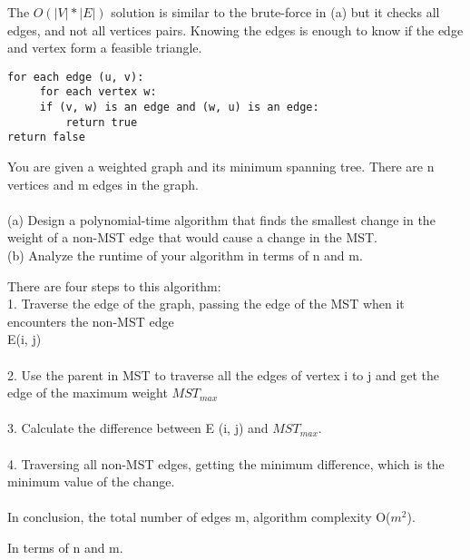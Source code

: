 \documentclass[10pt]{article}
\newenvironment{exercise}[2][Exercise]{\begin{trivlist}
\item[\hskip \labelsep {\bfseries #1}\hskip \labelsep {\bfseries #2.}]}{\end{trivlist}}
\newenvironment{solution}[2][Solution]{\begin{trivlist}
\item[\hskip \labelsep {\bfseries #1}\hskip \labelsep {\bfseries #2.}]}{\end{trivlist}}
\theoremstyle{definition}
\begin{document}
\begin{solution}{(4b)}
The $O(|V |*|E|)$ solution is similar to the brute-force in (a) but it checks all edges, and not all vertices pairs. Knowing the edges is enough to know if the edge and vertex form a feasible triangle.\\
\begin{verbatim}
for each edge (u, v):
     for each vertex w:
     if (v, w) is an edge and (w, u) is an edge:
         return true
return false
\end{verbatim}
\end{solution}

\begin{exercise}{(5)}
You are given a weighted graph and its minimum spanning tree. There are n vertices and m
edges in the graph.\\
\\
(a) Design a polynomial-time algorithm that finds the smallest change in the weight of a
non-MST edge that would cause a change in the MST.\\
(b) Analyze the runtime of your algorithm in terms of n and m.\\
\end{exercise}

\begin{solution}{(5a)}
There are four steps to this algorithm:\\
1. Traverse the edge of the graph, passing the edge of the MST when it encounters the non-MST edge\\
E(i, j)\\
\\
2. Use the parent in MST to traverse all the edges of vertex i to j and get the edge of the maximum weight $MST_{max}$\\
\\
3. Calculate the difference between E (i, j) and $MST_{max}$.\\
\\
4. Traversing all non-MST edges, getting the minimum difference, which is the minimum value of the change.\\
\\
In conclusion, the total number of edges m, algorithm complexity O($m^2$).
\end{solution}

\begin{solution}{(5b)}
In terms of n and m. 
\end{solution}
 
\end{document}
